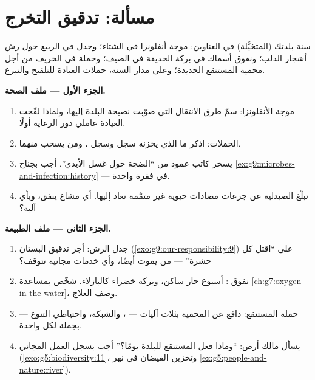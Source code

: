 \section{مسألة: تدقيق التخرج}

\begin{problem}\label{pb:g9:our-responsibility:1}
سنة بلدتك (المتخيَّلة) في العناوين: موجة أنفلونزا في
الشتاء؛ وجدل في الربيع حول رش أشجار الدلب؛ ونفوق أسماك
في بركة الحديقة في الصيف؛ وحملة في الخريف من أجل محمية
المستنقع الجديدة؛ وعلى مدار السنة، حملات العيادة للتلقيح
والتبرع.

\medskip\noindent\textbf{الجزء الأول --- ملف الصحة.}
\begin{enumerate}
  \item موجة الأنفلونزا: سمّ طرق الانتقال التي صوّبت
        نصيحة البلدة إليها، ولماذا لقّحت العيادة عاملي
        دور الرعاية أولًا.
  \item الحملات: اذكر ما الذي يخزنه سجل  وسجل
        ، ومن يسحب منهما.
  \item يسخر كاتب عمود من ``الضجة حول غسل الأيدي''. أجب
        بجناح
        \cref{ex:g9:microbes-and-infection:history} ---
        في فقرة واحدة.
  \item تبلّغ الصيدلية عن جرعات مضادات حيوية غير متمَّمة
        تعاد إليها. أي مشاع ينفق، وبأي آلية؟
\end{enumerate}

\medskip\noindent\textbf{الجزء الثاني --- ملف الطبيعة.}
\begin{enumerate}[resume]
  \item جدل الرش: أجر تدقيق البستان
        (\cref{exo:g9:our-responsibility:9}) على ``اقتل
        كل حشرة'' --- من يموت أيضًا، وأي خدمات مجانية
        تتوقف؟
  \item نفوق : أسبوع حار ساكن، وبركة خضراء
        كالبازلاء. شخّص بمساعدة
        \cref{ch:g7:oxygen-in-the-water}، وصف العلاج.
  \item حملة المستنقع: دافع عن المحمية بثلاث آليات ---
        ، والشبكة، واحتياطي التنوع --- بجملة لكل
        واحدة.
  \item يسأل مالك أرض: ``وماذا فعل المستنقع للبلدة
        يومًا؟'' أجب بسجل العمل المجاني
        (\cref{exo:g5:biodiversity:11}، وتخزين الفيضان
        في نهر \cref{ex:g5:people-and-nature:river}).
\end{enumerate}


\end{problem}
